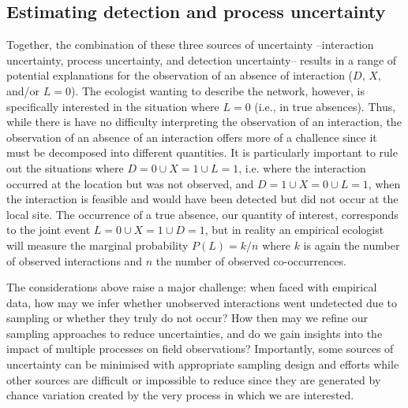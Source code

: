 \documentclass[12pt]{article}
\begin{document}
\begin{spacing}{2.0}
\section*{Estimating detection and process uncertainty}

    Together, the combination of these three sources of uncertainty --interaction uncertainty, process uncertainty, and detection uncertainty-- results in a range of potential explanations for the observation of an absence of interaction ($D$, $X$, and/or $L = 0$). The ecologist wanting to describe the network, however, is specifically interested in the situation where $L = 0$ (i.e., in true absences). Thus, while there is have no difficulty interpreting the observation of an interaction, the observation of an absence of an interaction offers more of a challence since it must be decomposed into different quantities. It is particularly important to rule out the situations where $D=0 \cup X = 1 \cup L=1$, i.e. where the interaction occurred at the location but was not observed, and $D=1 \cup X = 0 \cup L =1$, when the interaction is feasible and would have been detected but did not occur at the local site. The occurrence of a true absence, our quantity of interest, corresponds to the joint event $L=0 \cup X=1 \cup D=1$, but in reality an empirical ecologist will measure the marginal probability $P(L) = k/n$ where $k$ is again the number of observed interactions and $n$ the number of observed co-occurrences.


    The considerations above raise a major challenge: when faced with empirical data, how may we infer whether unobserved interactions went undetected due to sampling or whether they truly do not occur? How then may we refine our sampling approaches to reduce uncertainties, and do we gain insights into the impact of multiple processes on field observations? Importantly, some sources of uncertainty can be minimised with appropriate sampling design and efforts while other sources are difficult or impossible to reduce since they are generated by chance variation created by the very process in which we are interested.



\end{spacing}
\end{document}
